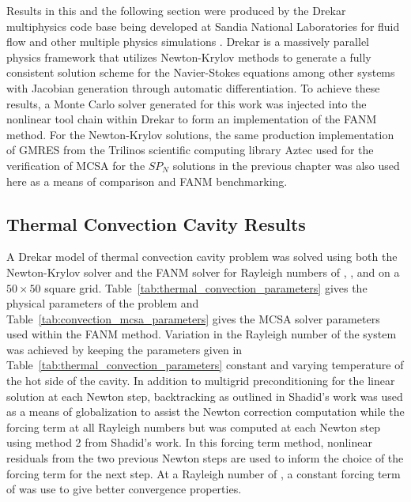 Results in this and the following section were produced by the Drekar
multiphysics code base being developed at Sandia National Laboratories
for fluid flow and other multiple physics simulations
\cite{pawlowski_drekar_2012}. Drekar is a massively parallel physics
framework that utilizes Newton-Krylov methods to generate a fully
consistent solution scheme for the Navier-Stokes equations among other
systems with Jacobian generation through automatic differentiation. To
achieve these results, a Monte Carlo solver generated for this work
was injected into the nonlinear tool chain within Drekar to form an
implementation of the FANM method. For the Newton-Krylov solutions,
the same production implementation of GMRES from the Trilinos
scientific computing library Aztec \cite{heroux_overview_2005} used
for the verification of MCSA for the $SP_N$ solutions in the previous
chapter was also used here as a means of comparison and FANM
benchmarking.

\subsection{Thermal Convection Cavity Results}
\label{subsec:thermal_convection_verification}

A Drekar model of thermal convection cavity problem was solved using
both the Newton-Krylov solver and the FANM solver for Rayleigh numbers
of , ,  and  on a $50 \times 50$
square grid. Table~\ref{tab:thermal_convection_parameters} gives the
physical parameters of the problem and
Table~\ref{tab:convection_mcsa_parameters} gives the MCSA solver
parameters used within the FANM method. Variation in the Rayleigh
number of the system was achieved by keeping the parameters given in
Table~\ref{tab:thermal_convection_parameters} constant and varying
temperature of the hot side of the cavity. In addition to multigrid
preconditioning for the linear solution at each Newton step,
backtracking as outlined in Shadid's work \cite{shadid_inexact_1997}
was used as a means of globalization to assist the Newton correction
computation while the forcing term at all Rayleigh numbers but
 was computed at each Newton step using method 2 from
Shadid's work. In this forcing term method, nonlinear residuals from
the two previous Newton steps are used to inform the choice of the
forcing term for the next step. At a Rayleigh number of , a
constant forcing term of  was use to give better convergence
properties.

